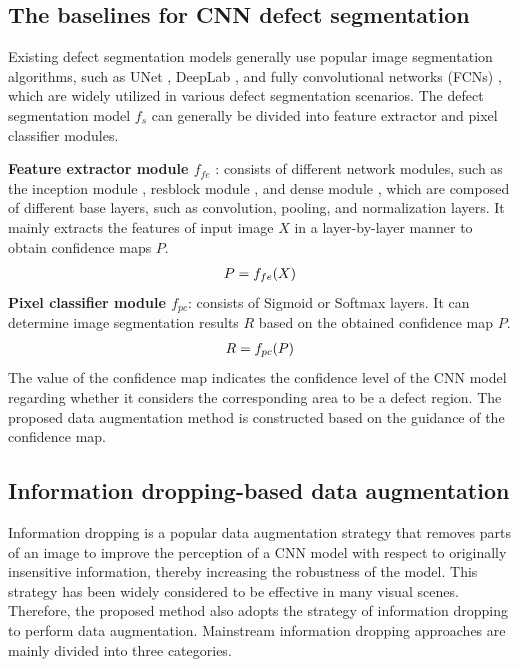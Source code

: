 \documentclass[sn-mathphys]{sn-jnl}%
\theoremstyle{thmstyleone}%
\theoremstyle{thmstyletwo}%
\theoremstyle{thmstylethree}%
\begin{document}
\subsection{The baselines for CNN defect segmentation}\label{sec:In}
Existing defect segmentation models generally use popular image segmentation algorithms, such as UNet \cite{ronneberger2015u}, DeepLab \cite{chen2018deeplab:}, and fully convolutional networks (FCNs) \cite{long2015fully}, which are widely utilized in various defect segmentation scenarios. The defect segmentation model $f_s$ can generally be divided into feature extractor and pixel classifier modules. 

\textbf{Feature extractor module $f_{fe}$} : consists of different network modules, such as the inception module \cite{szegedy2016rethinking}, resblock module \cite{he2016deep}, and dense module \cite{huang2017densely}, which are composed of different base layers, such as convolution, pooling, and normalization layers. It mainly extracts the features of input image $X$ in a layer-by-layer manner to obtain confidence maps $P$.
\begin{equation}
\centering
\begin{split}
P = f_{fe}(X)
\end{split}
\end{equation}
\textbf{Pixel classifier module $f_{pc}$}: consists of Sigmoid or Softmax layers. It can determine image segmentation results $R$ based on the obtained confidence map $P$. 
\begin{equation}
\centering
\begin{split}
R = f_{pc}(P)
\end{split}
\end{equation}
The value of the confidence map indicates the confidence level of the CNN model regarding whether it considers the corresponding area to be a defect region. The proposed data augmentation method is constructed based on the guidance of the confidence map.

\subsection{Information dropping-based data augmentation}\label{sec:In}

Information dropping is a popular data augmentation strategy that removes parts of an image to improve the perception of a CNN model with respect to originally insensitive information, thereby increasing the robustness of the model. This strategy has been widely considered to be effective in many visual scenes. Therefore, the proposed method also adopts the strategy of information dropping to perform data augmentation. Mainstream information dropping approaches are mainly divided into three categories.
\end{document}
